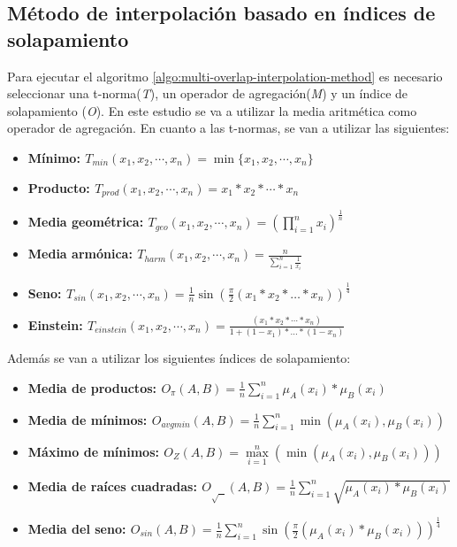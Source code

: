 \subsection{Método de interpolación basado en índices de solapamiento}
Para ejecutar el algoritmo \ref{algo:multi-overlap-interpolation-method} es necesario seleccionar una t-norma(\emph{T}), un operador de agregación(\emph{M}) y un índice de solapamiento (\emph{O}). En este estudio se va a utilizar la media aritmética como operador de agregación. En cuanto a las t-normas, se van a utilizar las siguientes:

\begin{itemize}
	\item \bfseries Mínimo: $T_{min}(x_{1},x_{2},\cdots,x_{n}) = \min\{x_{1},x_{2},\cdots,x_{n}\}$
	\item \bfseries Producto: $T_{prod}(x_{1},x_{2},\cdots,x_{n}) = x_{1}*x_{2} * \cdots * x_{n}$
	\item \bfseries Media geométrica: $T_{geo}(x_{1},x_{2},\cdots,x_{n}) = (\prod\limits_{i=1}^{n}x_{i})^{\frac{1}{n}}$
	\item \bfseries Media armónica: $T_{harm}(x_{1},x_{2},\cdots,x_{n}) = \frac{n}{\sum_{i=1}^{n}\frac{1}{x_i}}$
	\item \bfseries Seno: $T_{sin}(x_{1},x_{2},\cdots,x_{n}) = \frac{1}{n}\sin(\frac{\pi}{2}(x_1 * x_2 * \ldots * x_n))^{\frac{1}{4}}$
	\item \bfseries Einstein: $T_{einstein}(x_{1},x_{2},\cdots,x_{n}) = \frac{(x_{1}*x_{2} * \cdots * x_{n})}{1 + (1 - x_{1} )* \ldots * (1 - x_{n} )}$
\end{itemize}

Además se van a utilizar los siguientes índices de solapamiento:

\begin{itemize}
	\item \bfseries Media de productos: $O_{\pi}(A,B) = \frac{1}{n}\sum_{i=1}^{n}\mu_A(x_i)*\mu_B(x_i)$
	\item \bfseries Media de mínimos: $O_{avgmin}(A,B) = \frac{1}{n}\sum_{i=1}^{n}\min(\mu_A(x_i),\mu_B(x_i))$
	\item \bfseries Máximo de mínimos: $O_{Z}(A,B) = \max\limits_{i=1}^{n}(\min(\mu_A(x_i),\mu_B(x_i)))$
	\item \bfseries Media de raíces cuadradas: $O_{\sqrt{\text{ }}}(A,B) =  \frac{1}{n}\sum_{i=1}^{n}\sqrt{\mu_A(x_i)*\mu_B(x_i)}$
	\item \bfseries Media del seno:  $O_{sin}(A, B) = \frac{1}{n}\sum_{i=1}^{n}\sin(\frac{\pi}{2}(\mu_A(x_i)*\mu_B(x_i)))^{\frac{1}{4}}$
\end{itemize}

